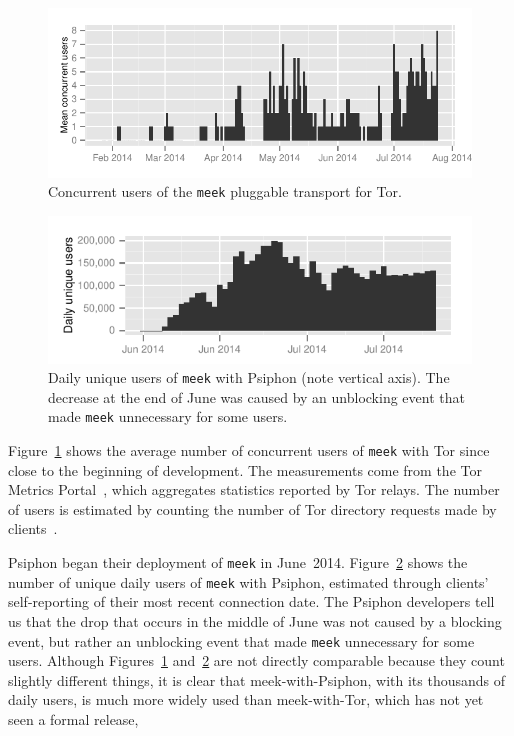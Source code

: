 \documentclass[conference]{IEEEtran}
\newcommand{\meek}{\texttt{meek}\xspace}
\begin{document}
\begin{figure}
\includegraphics[width=\linewidth]{clients-meek}
\caption{
Concurrent users of the \meek pluggable transport for Tor.
}
\label{fig:clients-tor}
\end{figure}

\begin{figure}
\includegraphics[width=\linewidth]{clients-psiphon3}
\caption{
Daily unique users of \meek with Psiphon (note vertical axis).
The decrease at the end of June
was caused by an unblocking event that made \meek unnecessary for some users.
}
\label{fig:clients-psiphon3}
\end{figure}

Figure~\ref{fig:clients-tor} shows the average number of concurrent users of \meek with Tor
since close to the beginning of development.
The measurements come from the Tor Metrics Portal~\cite{metrics-meek},
which aggregates statistics reported by Tor relays.
The number of users is estimated by counting the number
of Tor directory requests made by clients~\cite{counting-daily-bridge-users}.

Psiphon began their deployment of \meek in June~2014.
Figure~\ref{fig:clients-psiphon3} shows the number
of unique daily users of \meek with Psiphon,
estimated through clients' self-reporting of their most recent connection date.
The Psiphon developers tell us that the drop that occurs
in the middle of June was not caused by a blocking event,
but rather an unblocking event that made \meek unnecessary for some users.
Although Figures~\ref{fig:clients-tor} and~\ref{fig:clients-psiphon3}
are not directly comparable because they count slightly different things,
it is clear that meek-with-Psiphon, with its thousands of daily users,
is much more widely used than meek-with-Tor, which has not yet seen a formal release,
\end{document}
